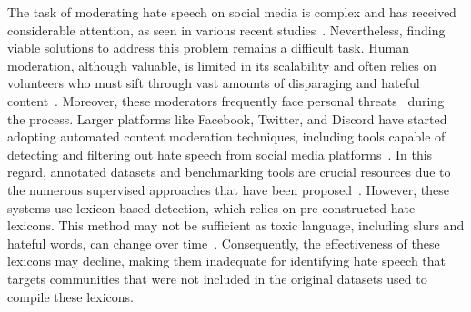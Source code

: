 The task of moderating hate speech on social media is complex and has received considerable attention, as seen in various recent studies~\cite{Poletto2020ResourcesAB,caselli-etal-2021-hatebert}.
Nevertheless, finding viable solutions to address this problem remains a difficult task.
Human moderation, although valuable, is limited in its scalability and often relies on volunteers who must sift through vast amounts of disparaging and hateful content~\cite{jhaver2019human,paudel2023lambretta}.
Moreover, these moderators frequently face personal threats~\cite{kozyreva2023resolving, york2019moderating} during the process. Larger platforms like Facebook, Twitter, and Discord have started adopting automated content moderation techniques, including tools capable of detecting and filtering out hate speech from social media platforms~\cite{fortuna2018survey}.
In this regard, annotated datasets and benchmarking tools are crucial resources due to the numerous supervised approaches that have been proposed~\cite{Poletto2020ResourcesAB}.
However, these systems use lexicon-based detection, which relies on pre-constructed hate lexicons.
This method may not be sufficient as toxic language, including slurs and hateful words, can change over time~\cite{waseem2016hateful}.
Consequently, the effectiveness of these lexicons may decline, making them inadequate for identifying hate speech that targets communities that were not included in the original datasets used to compile these lexicons.

